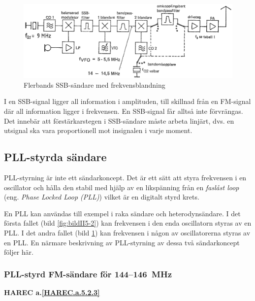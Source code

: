 \begin{figure}
  \includegraphics[width=\textwidth]{images/cropped_pdfs/bild_2_5-06.pdf}
  \caption{Flerbands SSB-sändare med frekvensblandning}
  \label{fig:bildII5-6}
\end{figure}

I en SSB-signal ligger all information i amplituden, till skillnad
från en FM-signal där all information ligger i frekvensen.
En SSB-signal får alltså inte förvrängas.
Det innebär att förstärkarstegen i SSB-sändare måste arbeta linjärt, dvs. en
utsignal ska vara proportionell mot insignalen i varje moment.

\subsection{PLL-styrda sändare}

PLL-styrning är inte ett sändarkoncept. Det är ett sätt att styra
frekvensen i en oscillator och hålla den stabil med hjälp av en
likspänning från en \emph{faslåst loop} (eng. \emph{Phase Locked Loop (PLL)})
vilket är en digitalt styrd krets.

En PLL kan användas till exempel i raka sändare och heterodynsändare.
I det första fallet (bild \ref{fig:bildII5-2}) kan frekvensen i den enda
oscillatorn styras av en PLL.
I det andra fallet (bild \ref{fig:bildII5-6}) kan frekvensen i
någon av oscillatorerna styras av en PLL.
En närmare beskrivning av PLL-styrning av dessa två sändarkoncept följer här.

\subsubsection{PLL-styrd FM-sändare för 144--146~MHz}
\textbf{HAREC
  a.\ref{HAREC.a.5.2.3}\label{myHAREC.a.5.2.3}
}

